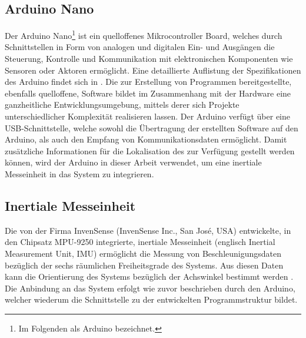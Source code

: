 \prever{
}

\subsection{Arduino\textsuperscript{\texttrademark} Nano}
\label{chap.arduino}
Der Arduino\textsuperscript{\texttrademark} Nano\footnote{Im Folgenden als Arduino bezeichnet.} ist ein quelloffenes Mikrocontroller Board, welches durch Schnittstellen in Form von analogen und digitalen Ein- und Ausgängen die Steuerung, Kontrolle und Kommunikation mit elektronischen Komponenten wie Sensoren oder Aktoren ermöglicht. Eine detaillierte Auflistung der Spezifikationen des Arduino findet sich in . Die zur Erstellung von Programmen bereitgestellte, ebenfalls quelloffene, Software bildet im Zusammenhang mit der Hardware eine ganzheitliche Entwicklungsumgebung, mittels derer sich Projekte unterschiedlicher Komplexität realisieren lassen. Der Arduino verfügt über eine USB-Schnittstelle, welche sowohl die Übertragung der erstellten Software auf den Arduino, als auch den Empfang von Kommunikationsdaten ermöglicht. Damit zusätzliche Informationen für die Lokalisation des  zur Verfügung gestellt werden können, wird der Arduino in dieser Arbeit verwendet, um eine inertiale Messeinheit in das System zu integrieren.

\prever{
}


\subsection{Inertiale Messeinheit}
\label{chap.imu}
Die von der Firma InvenSense (InvenSense Inc., San Jos\'e, USA) entwickelte, in den Chipsatz MPU-9250 integrierte, inertiale Messeinheit (englisch Inertial Measurement Unit, IMU) ermöglicht die Messung von Beschleunigungsdaten bezüglich der sechs räumlichen Freiheitsgrade des Systems. Aus diesen Daten kann die Orientierung des Systems bezüglich der Achswinkel bestimmt werden \cite{IMU}. Die Anbindung an das System erfolgt wie zuvor beschrieben durch den Arduino, welcher wiederum die Schnittstelle zu der entwickelten Programmstruktur bildet.
\prever{
}

